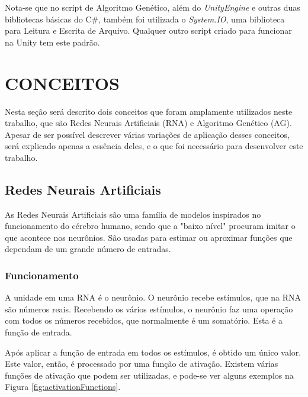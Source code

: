 \documentclass[12pt,a4paper]{article}
\begin{document}
		Nota-se que no script de Algoritmo Genético, além do \textit{UnityEngine} e outras duas bibliotecas básicas do C\#,
		também foi utilizada o \textit{System.IO}, uma biblioteca para Leitura e Escrita de Arquivo.
		Qualquer outro script criado para funcionar na Unity tem este padrão.

\FloatBarrier
\newpage %
\section{CONCEITOS}

	Nesta seção será descrito dois conceitos que foram amplamente utilizados neste trabalho,
	que são Redes Neurais Artificiais (RNA) e Algoritmo Genético (AG).
	Apesar de ser possível descrever várias variações de aplicação desses conceitos,
	será explicado apenas a essência deles,
	e o que foi necessário para desenvolver este trabalho.

	\FloatBarrier
	\subsection{Redes Neurais Artificiais}
	As Redes Neurais Artificiais são uma família de modelos inspirados no funcionamento do cérebro humano,
	sendo que a "baixo nível"{} procuram imitar o que acontece nos neurônios.
	São usadas para estimar ou aproximar funções que dependam de um grande número de entradas.
	
	\subsubsection{Funcionamento}
	A unidade em uma RNA é o neurônio.
	O neurônio recebe estímulos, que na RNA são números reais.
	Recebendo os vários estímulos, o neurônio faz uma operação com todos os números recebidos,
	que normalmente é um somatório.
	Esta é a função de entrada.
	
	Após aplicar a função de entrada em todos os estímulos,
	é obtido um único valor.
	Este valor, então, é processado por uma função de ativação.
	Existem várias funções de ativação que podem ser utilizadas,
	e pode-se ver alguns exemplos na Figura \ref{fig:activationFunctions}.
	
\end{document}

